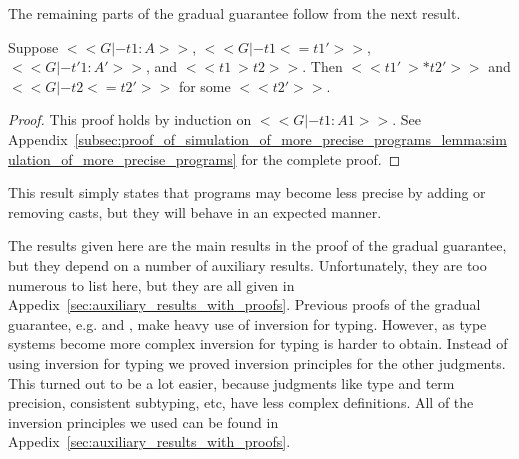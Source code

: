 The remaining parts of the gradual guarantee follow from the next
result.
\begin{lemma}
  \label{lemma:simulation_of_more_precise_programs}
  Suppose $<<G |- t1 : A>>$, $<<G |- t1 <= t1'>>$, $<<G |- t'1 : A'>>$, and $<<t1 ~> t2>>$.
  Then $<<t1' ~>* t2'>>$ and $<<G |- t2 <= t2'>>$ for some $<<t2'>>$.
\end{lemma}
\begin{proof}
  This proof holds by induction on $<<G |- t1 : A1>>$.  See
  Appendix~\ref{subsec:proof_of_simulation_of_more_precise_programs_lemma:simulation_of_more_precise_programs}
  for the complete proof.
\end{proof}
This result simply states that programs may become less precise by
adding or removing casts, but they will behave in an expected manner.

The results given here are the main results in the proof of the
gradual guarantee, but they depend on a number of auxiliary results.
Unfortunately, they are too numerous to list here, but they are all
given in Appedix~\ref{sec:auxiliary_results_with_proofs}.  Previous
proofs of the gradual guarantee, e.g. \cite{Siek:2015} and
\cite{Garcia:2016}, make heavy use of inversion for typing.  However,
as type systems become more complex inversion for typing is harder to
obtain.  Instead of using inversion for typing we proved inversion
principles for the other judgments.  This turned out to be a lot
easier, because judgments like type and term precision, consistent
subtyping, etc, have less complex definitions.  All of the inversion
principles we used can be found in
Appedix~\ref{sec:auxiliary_results_with_proofs}.

